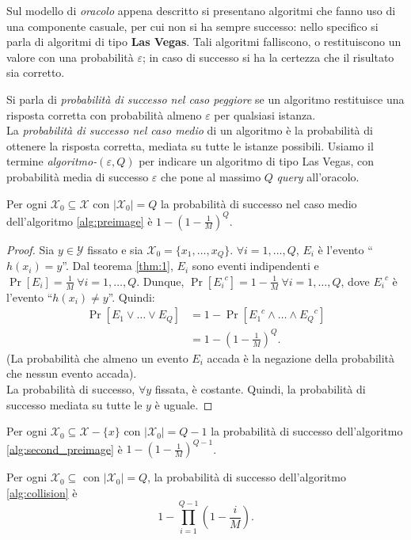 Sul modello di \emph{oracolo} appena descritto si presentano algoritmi che fanno uso di una componente casuale, per cui non si ha sempre successo: nello specifico si parla di algoritmi di tipo \textbf{Las Vegas}. Tali algoritmi falliscono, o restituiscono un valore con una probabilità $\varepsilon$; in caso di successo si ha la certezza che il risultato sia corretto.

\vspace{1em}\noindent
Si parla di \emph{probabilità di successo nel caso peggiore} se un algoritmo restituisce una risposta corretta con probabilità almeno $\varepsilon$ per qualsiasi istanza. \\ La \emph{probabilità di successo nel caso medio} di un algoritmo è la probabilità di ottenere la risposta corretta, mediata su tutte le istanze possibili. Usiamo il termine \emph{algoritmo-$(\varepsilon,Q)$} per indicare un algoritmo di tipo Las Vegas, con probabilità media di successo $\varepsilon$ che pone al massimo $Q$ \emph{query} all'oracolo.



\begin{theorem}
    Per ogni $\mathcal{X}_0 \subseteq \mathcal{X}$ con $|\mathcal{X}_0| = Q$ la probabilità di successo nel caso medio dell'algoritmo \ref{alg:preimage} è $1-\left(1-\frac{1}{M}\right)^Q$.
\end{theorem}
\begin{proof} Sia $y \in \mathcal{Y}$ fissato e sia $\mathcal{X}_0=\{x_1, \dots, x_Q\}$. $\forall i=1,\dots,Q$, $E_i$ è l'evento ``$h(x_i) = y$''. Dal teorema \ref{thm:1}, $E_i$ sono eventi indipendenti e $\Pr[E_i]=\frac{1}{M} \ \forall i=1,\dots,Q$. Dunque, $\Pr[{E_i}^c]=1-\frac{1}{M} \ \forall i=1,\dots,Q$, dove ${E_i}^c$ è l'evento ``$h(x_i) \neq y$''. Quindi:
    \begin{align*}
        \Pr[E_1 \lor \dots \lor E_Q ] &= 1-\Pr[{E_1}^c \land \dots \land {E_Q}^c]\\
        &=1-\left(1-\frac{1}{M}\right)^Q.
    \end{align*} 
    \noindent (La probabilità che almeno un evento $E_i$ accada è la negazione della probabilità che nessun evento accada). \\ 
La probabilità di successo, $\forall y$ fissata, è costante. Quindi, la probabilità di successo mediata su tutte le $y$ è uguale.  
\end{proof}


\begin{theorem}
    Per ogni $\mathcal{X}_0 \subseteq \mathcal{X}-\{x\}$ con $|\mathcal{X}_0| = Q-1$ la probabilità di successo dell'algoritmo \ref{alg:second_preimage} è  $1-\left(1-\frac{1}{M}\right)^{Q-1}$.
\end{theorem}

\begin{theorem}
    Per ogni $\mathcal{X}_0 \subseteq$ con $|\mathcal{X}_0| = Q$, la probabilità di successo dell'algoritmo \ref{alg:collision} è 
    \[
        1 - \prod_{i=1}^{Q-1}\left(1-\frac{i}{M}\right).
    \]
\end{theorem}

